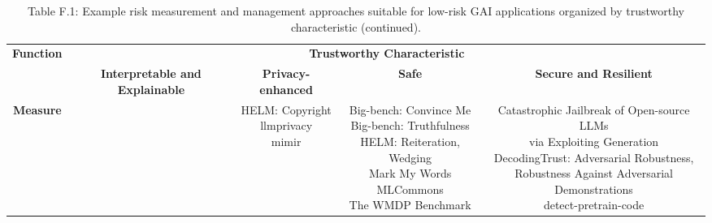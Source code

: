 \documentclass[fleqn]{article}
\begin{document}
\begin{landscape}
\vfill
\raisebox{-10pt}{\makebox[\linewidth]{\thepage}}

\pagebreak
\thispagestyle{empty}

\begin{table}[H]
	\caption*{Table F.1: Example risk measurement and management approaches suitable for low-risk GAI applications organized by trustworthy characteristic (continued).}
	\footnotesize
	\begin{tabular}{|c|c|c|c|c|}
		\hline
		\multirow{2}{*}{\textbf{Function}} & \multicolumn{4}{|c|}{\textbf{Trustworthy Characteristic}}   \\
		\cline{2-5}
		& \textbf{Interpretable and Explainable} & \textbf{Privacy-enhanced} & \textbf{Safe} & \textbf{Secure and Resilient} \\
		\hline
		\textbf{Measure} & 
		& 
		\makecell[l]{
			\textbullet\hspace{3pt} HELM: Copyright \\
			\textbullet\hspace{3pt} llmprivacy \\
			\textbullet\hspace{3pt} mimir			
		}
		&
		\makecell[l]{ 
			\textbullet\hspace{3pt} Big-bench: Convince Me \\ 
			\textbullet\hspace{3pt} Big-bench: Truthfulness \\ 
			\textbullet\hspace{3pt} HELM: Reiteration, Wedging \\ 
			\textbullet\hspace{3pt} Mark My Words \\ 
			\textbullet\hspace{3pt} MLCommons \\ 
			\textbullet\hspace{3pt} The WMDP Benchmark \\ 
		}	
		&
		\makecell[l]{
			\textbullet\hspace{3pt} Catastrophic Jailbreak of Open-source LLMs \\\hspace{10pt}via Exploiting Generation \\ 
			\textbullet\hspace{3pt} DecodingTrust: Adversarial Robustness, \\\hspace{10pt}Robustness Against Adversarial Demonstrations \\ 
			\textbullet\hspace{3pt} detect-pretrain-code \\ 
}
\end{tabular}
\end{table}
\end{landscape}
\end{document}
